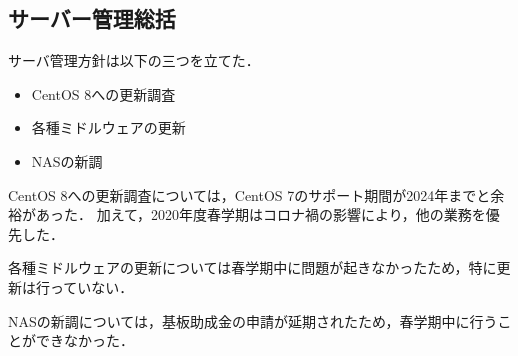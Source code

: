 \subsection*{サーバー管理総括}


サーバ管理方針は以下の三つを立てた．
\begin{itemize}
    \item CentOS 8への更新調査
    \item 各種ミドルウェアの更新
    \item NASの新調
\end{itemize}

CentOS 8への更新調査については，CentOS 7のサポート期間が2024年までと余裕があった．
加えて，2020年度春学期はコロナ禍の影響により，他の業務を優先した．

各種ミドルウェアの更新については春学期中に問題が起きなかったため，特に更新は行っていない．

NASの新調については，基板助成金の申請が延期されたため，春学期中に行うことができなかった．
